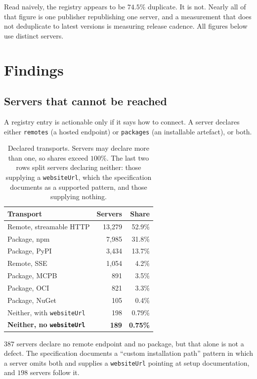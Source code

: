 \documentclass[11pt]{article}
\begin{document}
Read naively, the registry appears to be $74.5\%$ duplicate. It is not. Nearly
all of that figure is one publisher republishing one server, and a measurement
that does not deduplicate to latest versions is measuring release cadence. All
figures below use distinct servers.

\section{Findings}

\subsection{Servers that cannot be reached}

A registry entry is actionable only if it says how to connect. A server
declares either \texttt{remotes} (a hosted endpoint) or \texttt{packages} (an
installable artefact), or both.

\begin{table}[h]
\centering
\small
\begin{tabular}{lrr}
\toprule
Transport & Servers & Share \\
\midrule
Remote, streamable HTTP & 13{,}279 & 52.9\% \\
Package, npm            & 7{,}985  & 31.8\% \\
Package, PyPI           & 3{,}434  & 13.7\% \\
Remote, SSE             & 1{,}054  & 4.2\%  \\
Package, MCPB           & 891      & 3.5\%  \\
Package, OCI            & 821      & 3.3\%  \\
Package, NuGet          & 105      & 0.4\%  \\
\midrule
Neither, with \texttt{websiteUrl} & 198 & 0.79\% \\
\textbf{Neither, no \texttt{websiteUrl}} & \textbf{189} & \textbf{0.75\%} \\
\bottomrule
\end{tabular}
\caption{Declared transports. Servers may declare more than one, so shares
exceed $100\%$. The last two rows split servers declaring neither: those
supplying a \texttt{websiteUrl}, which the specification documents as a
supported pattern, and those supplying nothing.}
\label{tab:transport}
\end{table}

$387$ servers declare no remote endpoint and no package, but that alone is not
a defect. The specification documents a ``custom installation path'' pattern in
which a server omits both and supplies a \texttt{websiteUrl} pointing at setup
documentation, and $198$ servers follow it.
\end{document}
